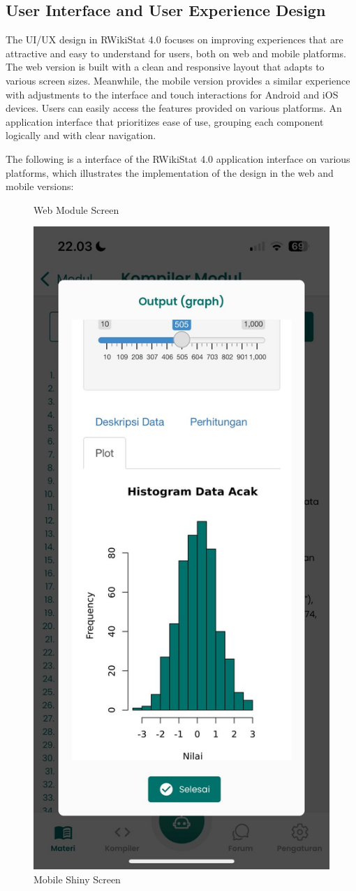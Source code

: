 \documentclass[conference,a4paper]{IEEEtran}
\begin{document}
\subsection{User Interface and User Experience Design}
The UI/UX design in RWikiStat 4.0 focuses on improving experiences that are
attractive and easy to understand for users, both on web and mobile platforms.
The web version is built with a clean and responsive layout that adapts to
various screen sizes. Meanwhile, the mobile version provides a similar
experience with adjustments to the interface and touch interactions for Android
and iOS devices. Users can easily access the features provided on various
platforms. An application interface that prioritizes ease of use, grouping each
component logically and with clear navigation.

The following is a interface of the RWikiStat 4.0 application interface on
various platforms, which illustrates the implementation of the design in the
web and mobile versions:

\begin{figure}[htb]
  \centering
  \caption{Web Module Screen}
  \label{distribution}
\end{figure}

\begin{figure}[htb]
  \centering
  \includegraphics [width=3.5 cm, height=6.5 cm]{images/shiny}
  \caption{Mobile Shiny Screen}
  \label{distribution}
\end{figure}
\end{document}
